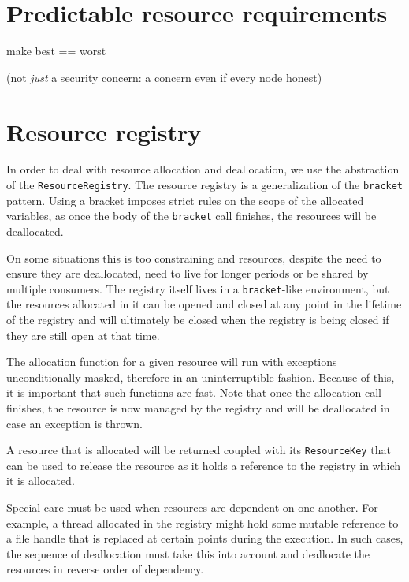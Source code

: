 \section{Predictable resource requirements}
\label{nonfunctional:best-is-worst}

make best == worst

(not \emph{just} a security concern: a concern even if every node honest)

\section{Resource registry}
\label{nonfunctional:resourceregistry}

In order to deal with resource allocation and deallocation, we use the
abstraction of the \lstinline!ResourceRegistry!. The resource registry is a
generalization of the \lstinline!bracket! pattern. Using a bracket imposes strict
rules on the scope of the allocated variables, as once the body of the
\lstinline!bracket! call finishes, the resources will be deallocated.

On some situations this is too constraining and resources, despite the need to
ensure they are deallocated, need to live for longer periods or be shared by
multiple consumers. The registry itself lives in a \lstinline!bracket!-like
environment, but the resources allocated in it can be opened and closed at any
point in the lifetime of the registry and will ultimately be closed when the
registry is being closed if they are still open at that time.

The allocation function for a given resource will run with exceptions
unconditionally masked, therefore in an uninterruptible fashion. Because of
this, it is important that such functions are fast. Note that once the
allocation call finishes, the resource is now managed by the registry and will
be deallocated in case an exception is thrown.

A resource that is allocated will be returned coupled with its
\lstinline!ResourceKey! that can be used to release the resource as it holds a
reference to the registry in which it is allocated.

Special care must be used when resources are dependent on one another. For
example, a thread allocated in the registry might hold some mutable reference to
a file handle that is replaced at certain points during the execution. In such
cases, the sequence of deallocation must take this into account and deallocate
the resources in reverse order of dependency.


